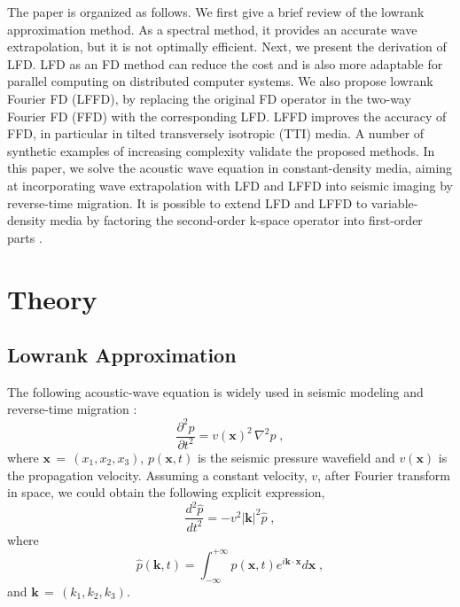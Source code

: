 The paper is organized as follows. 
We first give a brief review of the lowrank approximation method.
As a spectral method, it provides an accurate wave extrapolation,
but it is not optimally efficient.
Next, we present the derivation of LFD. 
LFD as an FD method can reduce the cost and 
is also more adaptable for parallel computing on distributed computer systems.
We also propose lowrank Fourier FD (LFFD), by replacing the original FD operator in the two-way Fourier FD (FFD) \cite[]{songx} with the corresponding LFD. 
LFFD improves the accuracy of FFD, in particular in tilted transversely isotropic (TTI) media.
A number of synthetic examples of increasing complexity validate the proposed methods.
In this paper, we solve the acoustic wave equation in constant-density media,
aiming at incorporating wave extrapolation with LFD and LFFD into seismic imaging by reverse-time migration. 
It is possible to extend LFD and LFFD to variable-density media by factoring the second-order k-space operator into first-order parts \cite[]{tabei,denffd}.


\section{Theory}

\subsection{Lowrank Approximation}

The following acoustic-wave equation is widely used in 
seismic modeling and reverse-time migration \cite[]{etgen1}:
\begin{equation}
\label{eq:acoustic} 
\frac{\partial^2p}{\partial t^2} = v(\mathbf{x})^2\,\nabla^2p\;,
\end{equation}
where $\mathbf{x}\,=\,(x_1,x_2,x_3)$, $p(\mathbf{x},t)$ is the seismic pressure wavefield 
and $v(\mathbf{x})$ is the propagation velocity.
Assuming a constant velocity, $v$, after Fourier transform in space,
 we could obtain the following explicit expression,
\begin{equation}
\label{eq:ode} 
\frac{d^2\hat{p}}{dt^2} = -v^2|\mathbf{k}|^2\hat{p}\;,
\end{equation}
where
\begin{equation}
\label{eq:p} 
\hat{p}(\mathbf{k},t)=\int^{+\infty}_{-\infty}{p(\mathbf{x},t)e^{i\mathbf{k}\cdot\mathbf{x}}d\mathbf{x}}\;,
\end{equation}
and $\mathbf{k}\,=\,(k_1,k_2,k_3)$.

